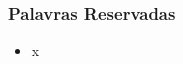 \documentclass{beamer}
\begin{document}
\begin{frame}
	\frametitle{Palavras Reservadas}
	\begin{itemize}
		\item x
	\end{itemize}
\end{frame}

\begin{frame}
	\frametitle{}
	\begin{columns}[T] %
		\begin{column}{.50\textwidth}
		\end{column}%
		\hfill%
		\begin{column}{.50\textwidth}
		\end{column}%
	\end{columns}
\end{frame}
\end{document}
